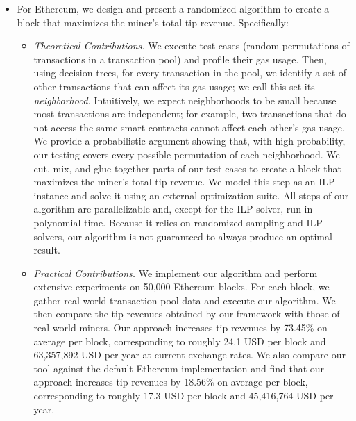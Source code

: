 \begin{itemize}
\begin{itemize}
        \item For Ethereum, we design and present a randomized algorithm to create a block that maximizes the miner's total tip revenue. Specifically:
        \begin{itemize}
            \item \emph{Theoretical Contributions.} We execute test cases (random permutations of transactions in a transaction pool) and profile their gas usage. Then, using decision trees, for every transaction in the pool, we identify a set of other transactions that can affect its gas usage; we call this set its \emph{neighborhood}. Intuitively, we expect neighborhoods to be small because most transactions are independent; for example, two transactions that do not access the same smart contracts cannot affect each other's gas usage. We provide a probabilistic argument showing that, with high probability, our testing covers every possible permutation of each neighborhood. We cut, mix, and glue together parts of our test cases to create a block that maximizes the miner's total tip revenue. We model this step as an ILP instance and solve it using an external optimization suite. All steps of our algorithm are parallelizable and, except for the ILP solver, run in polynomial time. Because it relies on randomized sampling and ILP solvers, our algorithm is not guaranteed to always produce an optimal result.
            
            \item \emph{Practical Contributions.} We implement our algorithm and perform extensive experiments on 50,000 Ethereum blocks. For each block, we gather real-world transaction pool data and execute our algorithm. We then compare the tip revenues obtained by our framework with those of real-world miners. Our approach increases tip revenues by 73.45\% on average per block, corresponding to roughly 24.1 USD per block and 63,357,892 USD per year at current exchange rates. We also compare our tool against the default Ethereum implementation and find that our approach increases tip revenues by 18.56\% on average per block, corresponding to roughly 17.3 USD per block and 45,416,764 USD per year.
        \end{itemize}
    \end{itemize}
    

\end{itemize}
